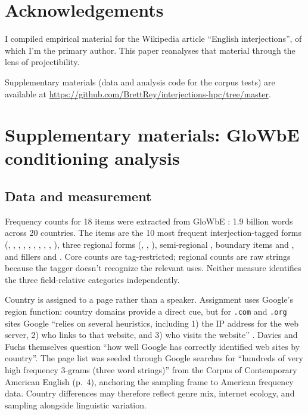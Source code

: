 \documentclass[12pt]{article}
\newif\ifblind
\begin{document}
\ifblind\else
\section*{Acknowledgements}

I compiled empirical material for the Wikipedia article \enquote{English interjections}, of which I'm the primary author. This paper reanalyses that material through the lens of projectibility.

Supplementary materials (data and analysis code for the corpus tests) are available at \url{https://github.com/BrettRey/interjections-hpc/tree/master}.
\fi


\clearpage
\begingroup
\setlength{\emergencystretch}{3em}
\printbibliography
\endgroup

\clearpage
\appendix

\section[Supplementary materials]{Supplementary materials: GloWbE conditioning analysis}
\label{app:conditioning}

\subsection{Data and measurement}

Frequency counts for 18 items were extracted from GloWbE \citep{daviesfuchs2015}: 1.9 billion words across 20 countries. The items are the 10 most frequent interjection-tagged forms (, , , , , , , , , ), three regional forms (, , ), semi-regional , boundary items  and , and fillers  and . Core counts are tag-restricted; regional counts are raw strings because the tagger doesn't recognize the relevant uses. Neither measure identifies the three field-relative categories independently.

Country is assigned to a page rather than a speaker. Assignment uses Google's region function: country domains provide a direct cue, but for \texttt{.com} and \texttt{.org} sites Google \enquote{relies on several heuristics, including 1) the IP address for the web server, 2) who links to that website, and 3) who visits the website} \citep[4]{daviesfuchs2015}. Davies and Fuchs themselves question \enquote{how well Google has correctly identified web sites by country}. The page list was seeded through Google searches for \enquote{hundreds of very high frequency 3-grams (three word strings)} from the Corpus of Contemporary American English (p.~4), anchoring the sampling frame to American frequency data. Country differences may therefore reflect genre mix, internet ecology, and sampling alongside linguistic variation.
\end{document}

